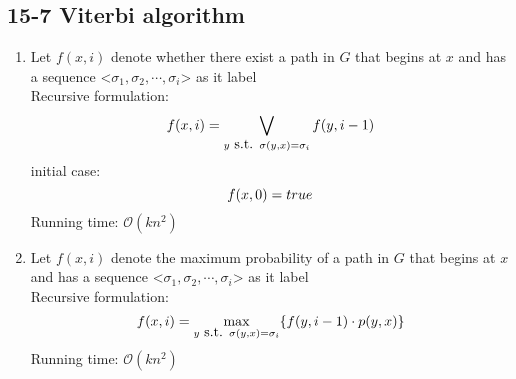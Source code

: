 \subsection*{15-7 Viterbi algorithm}
\begin{enumerate}
	\item	Let $f(x, i)$ denote whether there exist a path in $G$ that begins at $x$ and has a sequence <$\sigma_1, \sigma_2, \cdots, \sigma_i$> as it label \\
		Recursive formulation:
		\begin{equation} \notag
			f(x, i) = \bigvee_{y \mbox{ s.t. } \sigma(y, x) = \sigma_i } f(y, i - 1)
		\end{equation}
		initial case:
		\begin{equation} \notag
			f(x, 0) = true
		\end{equation}
		Running time: $\mathcal{O}(kn^2)$
	\item	Let $f(x, i)$ denote the maximum probability of a path in $G$ that begins at $x$ and has a sequence <$\sigma_1, \sigma_2, \cdots, \sigma_i$> as it label \\
		Recursive formulation:
		\begin{equation} \notag
			f(x, i) = \max_{y \mbox{ s.t. } \sigma(y, x) = \sigma_i}\{f(y, i - 1) \cdot p(y, x)\}
		\end{equation}
		Running time: $\mathcal{O}(kn^2)$
\end{enumerate}

